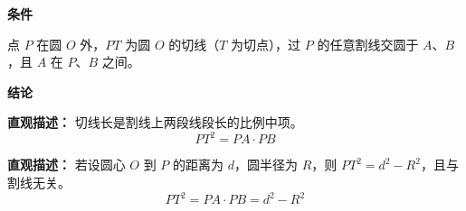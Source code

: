 \begin{statementbox}
	\textbf{\textcolor{CStatement}{条件}}
	\begin{description}[style=nextline, leftmargin=2.8em, labelsep=0.5em, itemsep=0.35em]
		\item[\textbf{\textcolor{CStatement}{条件1（P在圆外引线）：}}] 点 $P$ 在圆 $O$ 外，$PT$ 为圆 $O$ 的切线（$T$ 为切点），过 $P$ 的任意割线交圆于 $A$、$B$，且 $A$ 在 $P$、$B$ 之间。
	\end{description}

	\textbf{\textcolor{CStatement}{结论}}
	\begin{description}[style=nextline, leftmargin=2.8em, labelsep=0.5em, itemsep=0.45em]
		\item[\textbf{\textcolor{CStatement}{结论一（切割线定理）：}}]
			\textbf{\textcolor{CStatement}{直观描述：}}
			切线长是割线上两段线段长的比例中项。
			\[
				PT^{2}=PA\cdot PB
			\]

		\item[\textbf{\textcolor{CStatement}{推广结论（圆幂公式）：}}]
			\textbf{\textcolor{CStatement}{直观描述：}}
			若设圆心 $O$ 到 $P$ 的距离为 $d$，圆半径为 $R$，则 $PT^{2}=d^{2}-R^{2}$，且与割线无关。
			\[
				PT^{2}=PA\cdot PB=d^{2}-R^{2}
			\]
	\end{description}
\end{statementbox}
